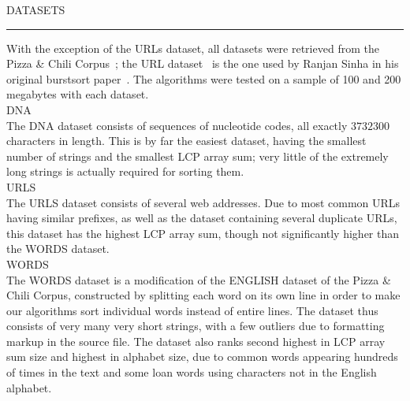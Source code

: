 \sffamily\normalsize{\color{sciorange}DATASETS}\small\\
\rule[3mm]{190mm}{0.1pt}\vspace{-7mm}
 \footnotesize 
\begin{multicols}{3}
With the exception of the URLs dataset, all datasets were retrieved from
the Pizza \& Chili Corpus~\cite{fn2005}; the URL dataset~\cite{sinha} is the one used by Ranjan Sinha
in his original burstsort paper~\cite{sw2008}. The algorithms were tested on a sample
of 100 and 200 megabytes with each dataset.\vspace{1.5mm}\\
{\sffamily\normalsize{\color{sciorange}DNA}}\small\\
\footnotesize 
The DNA dataset consists of sequences of nucleotide codes, all exactly $3732300$
characters in length.  This is by far the easiest dataset, having the smallest
number of strings and the smallest LCP array sum; very little of the extremely
long strings is actually required for sorting them.\vspace{1.5mm}\\
{\sffamily\normalsize{\color{sciorange}URLS}}\small\\
\footnotesize 
The URLS dataset consists of several web addresses.  Due to most common URLs
having similar prefixes, as well as the dataset containing several duplicate
URLs, this dataset has the highest LCP array sum, though not significantly
higher than the WORDS dataset.\vspace{1.5mm}\\
{\sffamily\normalsize{\color{sciorange}WORDS}}\small\\
\footnotesize 
The WORDS dataset is a modification of the ENGLISH dataset of the Pizza \& Chili
Corpus, constructed by splitting each word on its own line in order to make our
algorithms sort individual words instead of entire lines.  The dataset thus
consists of very many very short strings, with a few outliers due to formatting
markup in the source file.  The dataset also ranks second highest in LCP array
sum size and highest in alphabet size, due to common words appearing hundreds of
times in the text and some loan words using characters not in the English
alphabet.
\end{multicols}

 


